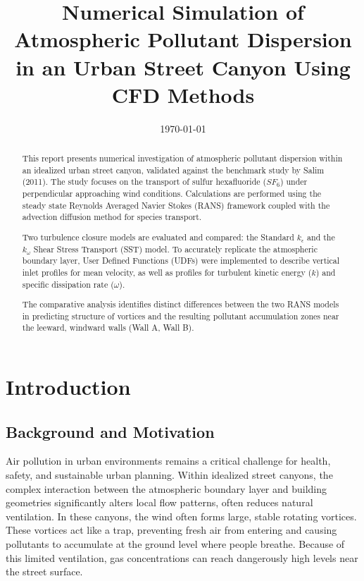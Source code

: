 \documentclass[11pt,a4paper]{report}
\title{Numerical Simulation of Atmospheric Pollutant Dispersion in an Urban Street Canyon Using CFD Methods}
\author{}
\date{\today}
\begin{document}
\maketitle

\begin{abstract}
This report presents numerical investigation of atmospheric pollutant dispersion within an idealized urban street canyon, validated against the benchmark study by Salim (2011). The study focuses on the transport of sulfur hexafluoride ($SF_6$) under perpendicular approaching wind conditions. Calculations are performed using the steady state Reynolds Averaged Navier Stokes (RANS) framework coupled with the advection diffusion method for species transport. 

Two turbulence closure models are evaluated and compared: the Standard $k_\epsilon$ and the $k_\omega$ Shear Stress Transport (SST) model. To accurately replicate the atmospheric boundary layer, User Defined Functions (UDFs) were implemented to describe vertical inlet profiles for mean velocity, as well as profiles for turbulent kinetic energy ($k$) and specific dissipation rate ($\omega$).

The comparative analysis identifies distinct differences between the two RANS models in predicting structure of vortices and the resulting pollutant accumulation zones near the leeward, windward walls (Wall A, Wall B).
\end{abstract}

\tableofcontents
\newpage


\chapter{Introduction}

\section{Background and Motivation}
Air pollution in urban environments remains a critical challenge for health, safety, and sustainable urban planning. Within idealized street canyons, the complex interaction between the atmospheric boundary layer and building geometries significantly alters local flow patterns, often reduces natural ventilation. In these canyons, the wind often forms large, stable rotating vortices. These vortices act like a trap, preventing fresh air from entering and causing pollutants to accumulate at the ground level where people breathe. Because of this limited ventilation, gas concentrations can reach dangerously high levels near the street surface.
\end{document}
